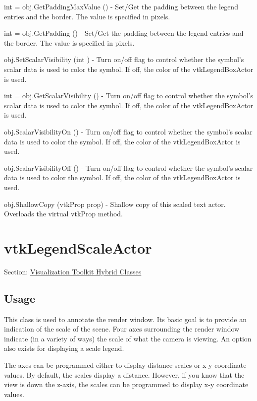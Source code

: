 \begin{DoxyItemize}
\item {\ttfamily int = obj.\-Get\-Padding\-Max\-Value ()} -\/ Set/\-Get the padding between the legend entries and the border. The value is specified in pixels.  
\item {\ttfamily int = obj.\-Get\-Padding ()} -\/ Set/\-Get the padding between the legend entries and the border. The value is specified in pixels.  
\item {\ttfamily obj.\-Set\-Scalar\-Visibility (int )} -\/ Turn on/off flag to control whether the symbol's scalar data is used to color the symbol. If off, the color of the vtk\-Legend\-Box\-Actor is used.  
\item {\ttfamily int = obj.\-Get\-Scalar\-Visibility ()} -\/ Turn on/off flag to control whether the symbol's scalar data is used to color the symbol. If off, the color of the vtk\-Legend\-Box\-Actor is used.  
\item {\ttfamily obj.\-Scalar\-Visibility\-On ()} -\/ Turn on/off flag to control whether the symbol's scalar data is used to color the symbol. If off, the color of the vtk\-Legend\-Box\-Actor is used.  
\item {\ttfamily obj.\-Scalar\-Visibility\-Off ()} -\/ Turn on/off flag to control whether the symbol's scalar data is used to color the symbol. If off, the color of the vtk\-Legend\-Box\-Actor is used.  
\item {\ttfamily obj.\-Shallow\-Copy (vtk\-Prop prop)} -\/ Shallow copy of this scaled text actor. Overloads the virtual vtk\-Prop method.  
\end{DoxyItemize}\hypertarget{vtkhybrid_vtklegendscaleactor}{}\section{vtk\-Legend\-Scale\-Actor}\label{vtkhybrid_vtklegendscaleactor}
Section\-: \hyperlink{sec_vtkhybrid}{Visualization Toolkit Hybrid Classes} \hypertarget{vtkwidgets_vtkxyplotwidget_Usage}{}\subsection{Usage}\label{vtkwidgets_vtkxyplotwidget_Usage}
This class is used to annotate the render window. Its basic goal is to provide an indication of the scale of the scene. Four axes surrounding the render window indicate (in a variety of ways) the scale of what the camera is viewing. An option also exists for displaying a scale legend.

The axes can be programmed either to display distance scales or x-\/y coordinate values. By default, the scales display a distance. However, if you know that the view is down the z-\/axis, the scales can be programmed to display x-\/y coordinate values.

